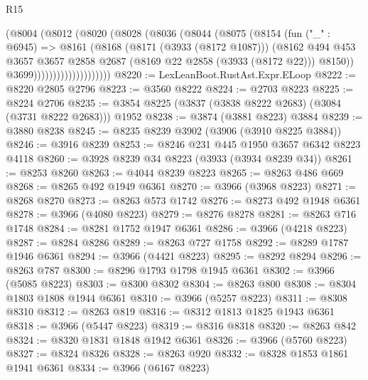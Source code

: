 \begin{lexlean}{R15}
\begin{coremodule}
                          (@8004
                            (@8012
                              (@8020
                                (@8028
                                  (@8036
                                    (@8044
                                      (@8075
                                        (@8154
                                          (fun ("_" : @6945) =>
                                          @8161
                                            (@8168
                                              (@8171 (@3933 (@8172 @1087)))
                                              (@8162
                                                @494
                                                @453
                                                @3657
                                                @3657
                                                @2858
                                                @2687
                                                (@8169 @22 @2858 (@3933 (@8172 @22)))
                                                @8150))
                                            @3699))))))))))))))))))))
@8220 := LexLeanBoot.RustAst.Expr.ELoop
@8222 := @8220 @2805 @2796
@8223 := @3560 @8222
@8224 := @2703 @8223
@8225 := @8224 @2706
@8235 := @3854 @8225 (@3837 (@3838 @8222 @2683) (@3084 (@3731 @8222 @2683))) @1952
@8238 := @3874 (@3881 @8223) @3884
@8239 := @3880 @8238
@8245 := @8235 @8239 @3902 (@3906 (@3910 @8225 @3884))
@8246 := @3916 @8239
@8253 := @8246 @231 @445 @1950 @3657 @6342 @8223 @4118
@8260 := @3928 @8239 @34 @8223 (@3933 (@3934 @8239 @34))
@8261 := @8253 @8260
@8263 := @4044 @8239 @8223
@8265 := @8263 @486 @669
@8268 := @8265 @492 @1949 @6361
@8270 := @3966 (@3968 @8223)
@8271 := @8268 @8270
@8273 := @8263 @573 @1742
@8276 := @8273 @492 @1948 @6361
@8278 := @3966 (@4080 @8223)
@8279 := @8276 @8278
@8281 := @8263 @716 @1748
@8284 := @8281 @1752 @1947 @6361
@8286 := @3966 (@4218 @8223)
@8287 := @8284 @8286
@8289 := @8263 @727 @1758
@8292 := @8289 @1787 @1946 @6361
@8294 := @3966 (@4421 @8223)
@8295 := @8292 @8294
@8296 := @8263 @787
@8300 := @8296 @1793 @1798 @1945 @6361
@8302 := @3966 (@5085 @8223)
@8303 := @8300 @8302
@8304 := @8263 @800
@8308 := @8304 @1803 @1808 @1944 @6361
@8310 := @3966 (@5257 @8223)
@8311 := @8308 @8310
@8312 := @8263 @819
@8316 := @8312 @1813 @1825 @1943 @6361
@8318 := @3966 (@5447 @8223)
@8319 := @8316 @8318
@8320 := @8263 @842
@8324 := @8320 @1831 @1848 @1942 @6361
@8326 := @3966 (@5760 @8223)
@8327 := @8324 @8326
@8328 := @8263 @920
@8332 := @8328 @1853 @1861 @1941 @6361
@8334 := @3966 (@6167 @8223)

\end{coremodule}
\end{lexlean}
